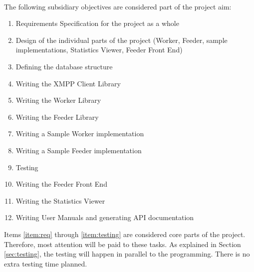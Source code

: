 \paragraph{}
The following subsidiary objectives are considered part of the project aim:
\begin{enumerate}
\item \label{item:req} Requirements Specification for the project as a whole
\item \label{item:design} Design of the individual parts of the project (Worker, Feeder, sample implementations, Statistics Viewer, Feeder Front End)
\item \label{item:db} Defining the database structure
\item \label{item:client} Writing the XMPP Client Library
\item \label{item:worker} Writing the Worker Library
\item \label{item:feeder} Writing the Feeder Library
\item \label{item:samplF} Writing a Sample Worker implementation
\item \label{item:samplW} Writing a Sample Feeder implementation
\item \label{item:testing} Testing
\item \label{item:frontend} Writing the Feeder Front End
\item \label{item:viewer} Writing the Statistics Viewer
\item \label{item:manual} Writing User Manuals and generating API documentation
\end{enumerate}
Items \ref{item:req} through \ref{item:testing} are considered core parts of the project. Therefore, most attention will be paid to these tasks. As explained in Section \ref{sec:testing}, the testing will happen in parallel to the programming. There is no extra testing time planned.
